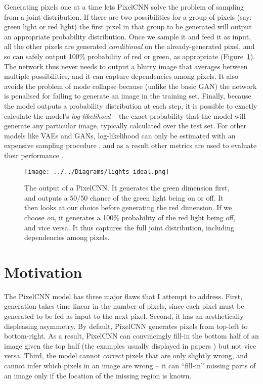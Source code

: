 \documentclass[11pt, a4paper, openany]{book}
\newcommand{\nquote}[1]{``{#1}''}
\begin{document}
Generating pixels one at a time lets PixelCNN solve the problem of sampling from a joint distribution. If there are two possibilities for a group of pixels (say: green light or red light) the first pixel in that group to be generated will output an appropriate probability distribution. Once we sample it and feed it as input, all the other pixels are generated \emph{conditional} on the already-generated pixel, and so can safely output 100\% probability of red or green, as appropriate (Figure~\ref{lightsideal}). The network thus never needs to output a blurry image that averages between multiple possibilities, and it can capture dependencies among pixels. It also avoids the problem of mode collapse because (unlike the basic GAN) the network is penalised for failing to generate an image in the training set. Finally, because the model outputs a probability distribution at each step, it is possible to exactly calculate the model's \emph{log-likelihood} -- the exact probability that the model will generate any particular image, typically calculated over the test set. For other models like VAEs and GANs, log-likelihood can only be estimated with an expensive sampling procedure \citep{likelihoodestimation}, and as a result other metrics are used to evaluate their performance \citep{ganmetrics}.

\begin{figure}
  \centering
  \texttt{[image: ../../Diagrams/lights\_ideal.png]}
  \caption[Output of a PixelCNN]{The output of a PixelCNN. It generates the green dimension first, and outputs a $50/50$ chance of the green light being on or off. It then looks at our choice before generating the red dimension. If we choose \emph{on}, it generates a 100\% probability of the red light being off, and vice versa. It thus captures the full joint distribution, including dependencies among pixels.}
  \label{lightsideal}
\end{figure}

\section{Motivation}

The PixelCNN model has three major flaws that I attempt to address. First, generation takes time linear in the number of pixels, since each pixel must be generated to be fed as input to the next pixel. Second, it has an aesthetically displeasing asymmetry. By default, PixelCNN generates pixels from top-left to bottom-right. As a result, PixelCNN can convincingly fill-in the bottom half of an image given the top half (the examples usually displayed in papers \citep{pixelcnn1,quantile}) but not vice versa. Third, the model cannot \emph{correct} pixels that are only slightly wrong, and cannot infer which pixels in an image are wrong -- it can \nquote{fill-in} missing parts of an image only if the location of the missing region is known.
\end{document}
